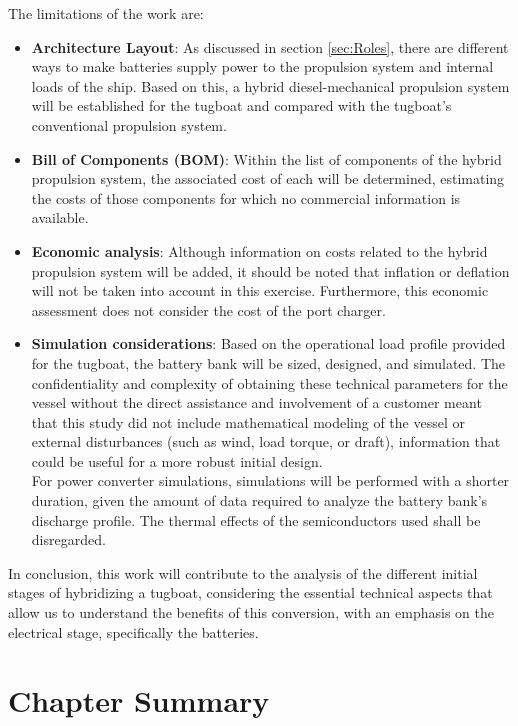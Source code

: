 The limitations of the work are:

\begin{itemize}
	\item \textbf{Architecture Layout}: As discussed in section \ref{sec:Roles}, there are different ways to make batteries supply power to the propulsion system and internal loads of the ship. Based on this, a hybrid diesel-mechanical propulsion system will be established for the tugboat and compared with the tugboat's conventional propulsion system.
	\item \textbf{Bill of Components (BOM)}: Within the list of components of the hybrid propulsion system, the associated cost of each will be determined, estimating the costs of those components for which no commercial information is available.
	\item \textbf{Economic analysis}: Although information on costs related to the hybrid propulsion system will be added, it should be noted that inflation or deflation will not be taken into account in this exercise. Furthermore, this economic assessment does not consider the cost of the port charger.
	\item \textbf{Simulation considerations}: Based on the operational load profile provided for the tugboat, the battery bank will be sized, designed, and simulated. The confidentiality and complexity of obtaining these technical parameters for the vessel without the direct assistance and involvement of a customer meant that this study did not include mathematical modeling of the vessel or external disturbances (such as wind, load torque, or draft), information that could be useful for a more robust initial design.\\	
	 For power converter simulations, simulations will be performed with a shorter duration, given the amount of data required to analyze the battery bank's discharge profile. The thermal effects of the semiconductors used shall be disregarded.
	
\end{itemize}

In conclusion, this work will contribute to the analysis of the different initial stages of hybridizing a tugboat, considering the essential technical aspects that allow us to understand the benefits of this conversion, with an emphasis on the electrical stage, specifically the batteries.

\section{Chapter Summary}

